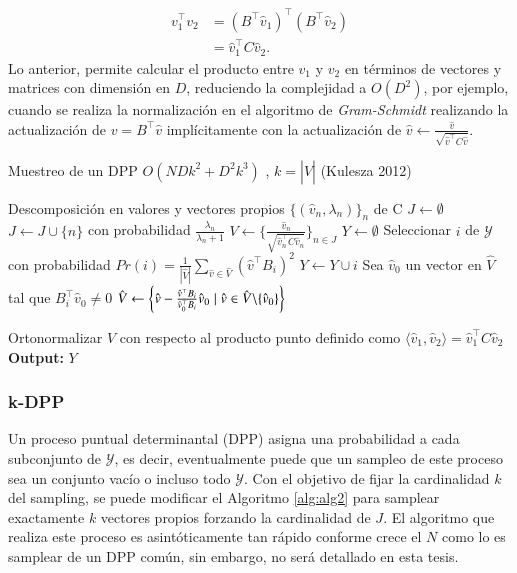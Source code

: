 \begin{align*}
    v_1^{\top}v_2 & = (B^{\top}\hat{v}_1)^{\top}(B^{\top}\hat{v}_2) \\
    & = \hat{v}_1^{\top}C\hat{v}_2.
\end{align*}
Lo anterior, permite calcular el producto entre $v_1$ y $v_2$ en términos de vectores y matrices con dimensión en $D$, reduciendo la complejidad a $O(D^2)$, por ejemplo, cuando se realiza la normalización en el algoritmo de \textit{Gram-Schmidt} realizando la actualización de $v = B^{\top}\hat{v}$ implícitamente con la actualización de $\hat{v} \gets \frac{\hat{v}}{\sqrt{\hat{v}^{\top}C\hat{v}}}$.

\begin{algorithm}
\caption{Muestreo de un DPP $O(NDk^2 + D^2k^3)$      , $k = |\hat{V}|$ (Kulesza 2012)}\label{alg:alg2}
\begin{algorithmic}
\Require Descomposición en valores y vectores propios 
$\{(\hat{v}_n , \lambda_n)\}_{n}$ de C
\State $J \gets \emptyset$
\State $J \gets J \cup \{n\}$ con probabilidad $\frac{\lambda_n}{\lambda_n+1}$
\EndFor
\State $V \gets \{ \frac{\hat{v}_n}{\sqrt{\hat{v}_n^{\top} C \hat{v}_n}} \}_{n \in J}$
\State $Y \gets \emptyset$
\State Seleccionar $i$ de $\mathcal{Y}$ con probabilidad $Pr(i) = \frac{1}{|\hat{V}|}\sum_{\hat{v} \in \hat{V}}(\hat{v}^{\top}B_i)^2$ 
\State $Y \gets Y \cup i$
\State Sea $\hat{v}_0$ un vector en $\hat{V}$ tal que $B_i^{\top}\hat{v}_0 \neq 0$
\State $\hat{V} \gets \left \{\hat{v} - \frac{\hat{v}^{\top}B_i}{\hat{v}_0^{\top}B_i}\hat{v}_0 \hspace{0.1cm}| \hspace{0.1cm} \hat{v} \in \hat{V} \backslash \{\hat{v}_0\} \right \}$

\State Ortonormalizar $\hat{V}$ con respecto al producto punto definido como $\langle \hat{v}_1 , \hat{v}_2 \rangle = \hat{v}_1^{\top}C\hat{v}_2$
\EndWhile   
\State \textbf{Output: } $Y$
\end{algorithmic}
\end{algorithm}

\subsubsection{k-DPP}

Un proceso puntual determinantal (DPP) asigna una probabilidad a cada subconjunto de $\mathcal{Y}$, es decir, eventualmente puede que un sampleo de este proceso sea un conjunto vacío o incluso todo $\mathcal{Y}$. Con el objetivo de fijar la cardinalidad $k$ del sampling, se puede modificar el Algoritmo \ref{alg:alg2} para samplear exactamente $k$ vectores propios forzando la cardinalidad de $J$. 
El algoritmo que realiza este proceso es asintóticamente tan rápido conforme crece el $N$ como lo es samplear de un DPP común, sin embargo, no será detallado en esta tesis. 

